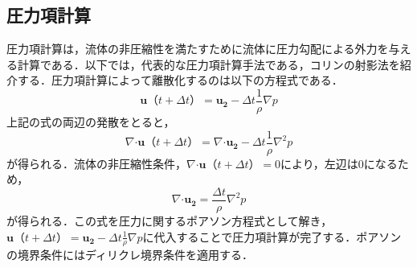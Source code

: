 \documentclass[a4j,12pt]{jreport}
\begin{document}
\subsection{圧力項計算}
圧力項計算は，流体の非圧縮性を満たすために流体に圧力勾配による外力を与える計算である．以下では，代表的な圧力項計算手法である，コリンの射影法を紹介する．圧力項計算によって離散化するのは以下の方程式である．
\[
	\bm{u} （t + \varDelta t）=  \bm{u_2} - \varDelta t \frac{1}{\rho}\nabla p
\]
上記の式の両辺の発散をとると，
\[
	\nabla\boldsymbol{\cdot}\bm{u} （t + \varDelta t）=  \nabla\boldsymbol{\cdot}\bm{u_2} - \varDelta t \frac{1}{\rho}\nabla^2 p
\]
が得られる．流体の非圧縮性条件，$\nabla\boldsymbol{\cdot}\bm{u} （t + \varDelta t）= 0$により，左辺は0になるため，
\begin{equation}
\nabla\boldsymbol{\cdot}\bm{u_2} = \frac{\varDelta t}{\rho}\nabla^2 p
\end{equation} 
が得られる．この式を圧力に関するポアソン方程式として解き，$\bm{u} （t + \varDelta t）=  \bm{u_2} - \varDelta t \frac{1}{\rho}\nabla p$に代入することで圧力項計算が完了する．ポアソンの境界条件にはディリクレ境界条件を適用する．


		
		
\end{document}
